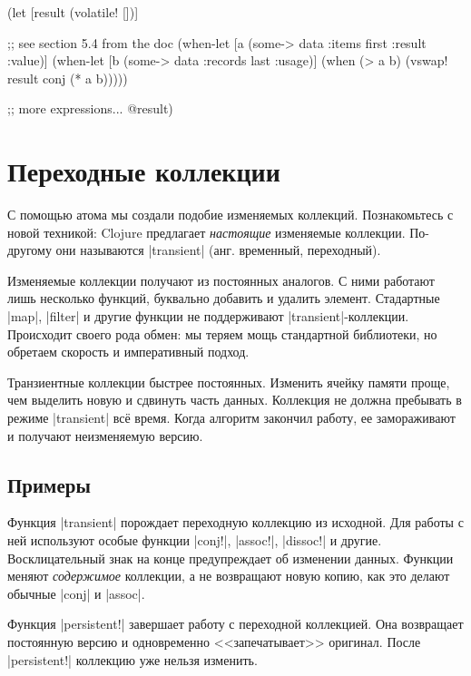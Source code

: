 \begin{english}
  \begin{clojure}
(let [result (volatile! [])]

  ;; see section 5.4 from the doc
  (when-let [a (some-> data :items first :result :value)]
    (when-let [b (some-> data :records last :usage)]
      (when (> a b)
        (vswap! result conj (* a b)))))

  ;; more expressions...
  @result)
  \end{clojure}
\end{english}

\section{Переходные коллекции}

С помощью атома мы создали подобие изменяемых коллекций. Познакомьтесь с новой
техникой: Clojure предлагает \emph{настоящие} изменяемые коллекции. По-другому
они называются \spverb|transient| (анг. временный, переходный).

Изменяемые коллекции получают из постоянных аналогов. С ними работают лишь
несколько функций, буквально добавить и удалить элемент. Стадартные
\spverb|map|, \spverb|filter| и другие функции не поддерживают
\spverb|transient|-коллекции. Происходит своего рода обмен: мы теряем мощь
стандартной библиотеки, но обретаем скорость и императивный подход.

Транзиентные коллекции быстрее постоянных. Изменить ячейку памяти проще, чем
выделить новую и сдвинуть часть данных. Коллекция не должна пребывать в режиме
\spverb|transient| вс\"{е} время. Когда алгоритм закончил работу, ее
замораживают и получают неизменяемую версию.

\subsection{Примеры}

Функция \spverb|transient| порождает переходную коллекцию из исходной. Для
работы с ней используют особые функции \spverb|conj!|, \spverb|assoc!|,
\spverb|dissoc!| и другие. Восклицательный знак на конце предупреждает об
изменении данных. Функции меняют \emph{содержимое} коллекции, а не возвращают
новую копию, как это делают обычные \spverb|conj| и \spverb|assoc|.

Функция \spverb|persistent!| завершает работу с переходной коллекцией. Она
возвращает постоянную версию и одновременно <<запечатывает>> оригинал. После
\spverb|persistent!| коллекцию уже нельзя изменить.

